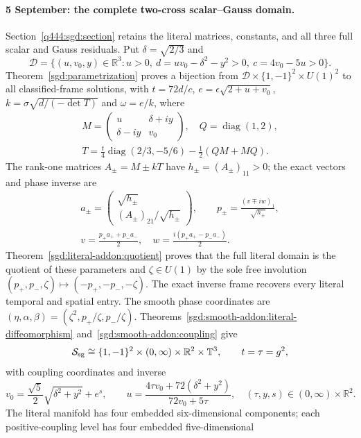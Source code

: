 \paragraph{5 September: the complete two-cross scalar--Gauss domain.}
Section~\ref{q444:sgd:section} retains the literal matrices, constants,
and all three full scalar and Gauss residuals. Put $\delta=\sqrt{2/3}$ and
\[
 \mathcal D=\{(u,v_0,y)\in\mathbb R^3:
 u>0,\ d=uv_0-\delta^2-y^2>0,\ c=4v_0-5u>0\}.
\]
Theorem~\ref{sgd:parametrization} proves a bijection from
$\mathcal D\times\{1,-1\}^2\times U(1)^2$ to all classified-frame
solutions, with $t=72d/c$, $e=\epsilon\sqrt{2+u+v_0}$,
$k=\sigma\sqrt{d/(-\det T)}$ and $\omega=e/k$, where
\[
 \begin{gathered}
 M=\begin{pmatrix}u&\delta+iy\\\delta-iy&v_0\end{pmatrix},\quad
 Q=\operatorname{diag}(1,2),\\
 T=\frac t4\operatorname{diag}(2/3,-5/6)
   -\frac12(QM+MQ).
 \end{gathered}
\]
The rank-one matrices $A_\pm=M\pm kT$ have $h_\pm=(A_\pm)_{11}>0$;
the exact vectors and phase inverse are
\[
 \begin{gathered}
 a_\pm=\begin{pmatrix}\sqrt{h_\pm}\\(A_\pm)_{21}/\sqrt{h_\pm}\end{pmatrix},\qquad
 p_\pm=\frac{(v\mp iw)_1}{\sqrt{h_\pm}},\\
 v=\frac{p_+a_++p_-a_-}{2},\quad
 w=\frac{i(p_+a_+-p_-a_-)}2.
 \end{gathered}
\]
Theorem~\ref{sgd:literal-addon:quotient} proves that the full literal
domain is the quotient of these parameters and $\zeta\in U(1)$ by
the sole free involution
$(p_+,p_-,\zeta)\mapsto(-p_+,-p_-,-\zeta)$.
The exact inverse frame recovers every literal temporal and spatial entry.
The smooth phase coordinates are
$(\eta,\alpha,\beta)=(\zeta^2,p_+/\zeta,p_-/\zeta)$.
Theorems~\ref{sgd:smooth-addon:literal-diffeomorphism}
and~\ref{sgd:smooth-addon:coupling} give
\[
 \mathcal S_{\rm sg}\cong\{1,-1\}^2\times(0,\infty)
                         \times\mathbb R^2\times\mathbb T^3,
 \qquad t=\tau=g^2,
\]
with coupling coordinates and inverse
\[
 v_0=\frac{\sqrt5}{2}\sqrt{\delta^2+y^2}+e^s,\qquad
 u=\frac{4\tau v_0+72(\delta^2+y^2)}{72v_0+5\tau},
 \quad (\tau,y,s)\in(0,\infty)\times\mathbb R^2.
\]
The literal manifold has four embedded six-dimensional components;
each positive-coupling level has four embedded five-dimensional
